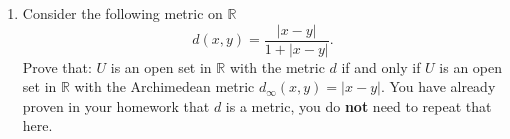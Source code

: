 \documentclass{amsart}
\newtheorem{theorem}{Theorem}
\begin{document}
\begin{enumerate}[1.]
\begin{theorem}
\begin{proof}
\begin{align*}
			\frac{1}{\beta} - \frac{\epsilon}{\beta^2 + \epsilon\beta} &= \\
		\end{align*}
		Thus, by choosing $\epsilon$ arbitrarily close to zero, we can assert that there exists
		$\frac{1}{\alpha} \in B$ such that:
		\[
			\frac{1}{\beta} - \frac{\epsilon}{\beta^2 + \epsilon\beta} < \frac{1}{\alpha} \leq \frac{1}{\beta}.
		\]
		It follows that $\frac{1}{\beta}$ is the least upper bound of $\frac{1}{B}$.
	\end{proof}
\end{theorem}
\begin{theorem}
	If $\inf(B) = 0$, then 
	\[
		\sup\left(\frac{1}{B}\right) = +\infty \text{ (i.e. $\frac{1}{B}$ is not bounded above) }
	\]
	\begin{proof}
		Note: since $\inf(B) = 0$ and $B \subseteq \mathbb{R^+}$, for all $\epsilon > 0$, there are infinitely many $\alpha_n \in B$ such that
		\[
			\epsilon > \alpha_1 > \alpha_2 > ... > 0
		\]
		Fix $\epsilon > 0$. Then:
		\begin{align*}
			\epsilon > \alpha_1 > &\alpha_2 > ... > 0 \\
			\frac{1}{\epsilon} < \frac{1}{\alpha_1} < &\frac{1}{\alpha_2} < ... < \frac{1}{0} = +\infty \\
		\end{align*}
		So we have shown that for every $\frac{1}{\alpha_n} \in \frac{1}{B}$, there exists a $\frac{1}{\alpha_{n+1}} \in \frac{1}{B}$ such that
		\[
			\frac{1}{\alpha_n} < \frac{1}{\alpha_{n+1}}
		\]
		Therefore, $\frac{1}{B}$ is not bounded above.
	\end{proof}
\end{theorem}

\newpage
\item Consider the following metric on $\mathbb R$
\[ d(x,y)=\frac{|x-y|}{1+|x-y|}. \]
Prove that: $U$ is an open set in $\mathbb R$ with the metric $d$ if and only if $U$ is an open
set in $\mathbb R$ with the Archimedean metric $d_{\infty}(x,y)=|x-y|$. You have already proven in your homework that $d$ is a metric, you do \textbf{not} need to repeat that here.


\end{enumerate}
\end{document}
